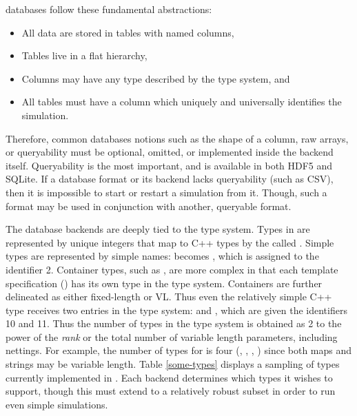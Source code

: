 \Cyclus databases follow these fundamental abstractions:
\begin{itemize}
    \item All data are stored in tables with named columns,
    \item Tables live in a flat hierarchy,
    \item Columns may have any type described by the \cyclus type system, and
    \item All tables must have a  column which uniquely and 
          universally identifies the simulation.
\end{itemize}
Therefore, common databases notions such as the shape of a column, raw arrays, or
queryability must be optional, omitted, or implemented inside the backend itself.
Queryability is the most important, and is available in both \gls{HDF5} and 
\gls{SQLite}. If a database format or its backend lacks 
queryability (such as \gls{CSV}), then it is impossible to start or restart a 
\cyclus simulation from it. Though, such a format may be used in 
conjunction with another, queryable format. 

The database backends are deeply tied to the \cyclus type system. Types in \cyclus
are represented by unique integers that map to C++ types by the  called .
Simple types are represented by simple names:  becomes
, which is assigned to the identifier 2. Container types, such as ,
are more complex in that each template specification () has
its own type in the \cyclus type system.  Containers are further delineated
as either fixed-length or \gls{VL}. Thus even the 
relatively simple C++ type  receives two entries in the 
\cyclus type system:  and , which are given 
the identifiers 10 and 11. 
Thus the number of types in the \cyclus type system is obtained as 
2 to the power of the \emph{rank} or the total number of variable length parameters, 
including nettings.
For example, the number of \cyclus types for  is 
four (, , , 
) since both maps and strings may be variable length.
Table \ref{some-types} displays a sampling of types currently implemented in 
\cyclus.
Each backend determines which types it wishes to support, though this must extend 
to a relatively robust subset in order to run even simple simulations.

